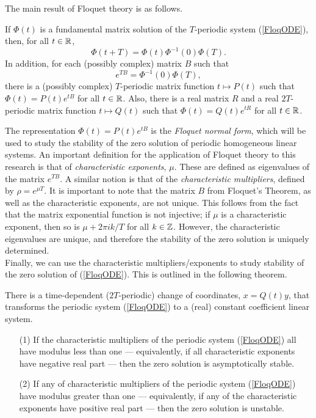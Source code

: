 \documentclass[12pt]{UOthesis}
\theoremstyle{remarkstyle}
\begin{document}
The main result of Floquet theory is as follows.

\begin{theo}
	If $\Phi(t)$ is a fundamental matrix solution of the $T$-periodic system (\ref{FloqODE}), then, for all $t\in \mathbb R$,
	$$\Phi(t+T)=\Phi(t)\Phi^{-1}(0)\Phi(T).$$
	In addition, for each (possibly complex) matrix $B$ such that
	$$e^{TB}=\Phi^{-1}(0)\Phi(T),$$
	there is a (possibly complex) $T$-periodic matrix function $t\mapsto P(t)$ such that $\Phi(t)=P(t)e^{tB}$ for all $t\in \mathbb R$. Also, there is a real matrix $R$ and a real $2T$-periodic matrix function $t\mapsto Q(t)$ such that $\Phi(t)=Q(t)e^{tR}$ for all $t\in \mathbb R$.
	\label{TheoFloquetsTheorem}
\end{theo}
	
The representation $\Phi(t)=P(t)e^{tB}$ is the \textit{Floquet normal form}, which will be used to study the stability of the zero solution of periodic homogeneous linear systems. An important definition for the application of Floquet theory to this research is that of \textit{characteristic exponents}, $\mu$. These are defined as eigenvalues of the matrix $e^{TB}$. A similar notion is that of the \textit{characteristic multipliers}, defined by $\rho=e^{\mu T}$. It is important to note that the matrix $B$ from Floquet's Theorem, as well as the characteristic exponents, are not unique. This follows from the fact that the matrix exponential function is not injective; if $\mu$ is a characteristic exponent, then so is $\mu+2\pi ik/T$ for all $k\in\mathbb Z$. However, the characteristic eigenvalues are unique, and therefore the stability of the zero solution is uniquely determined.\\

Finally, we can use the characteristic multipliers/exponents to study stability of the zero solution of (\ref{FloqODE}). This is outlined in the following theorem.

\begin{theo}
	There is a time-dependent ($2T$-periodic) change of coordinates, $x=Q(t)y$, that transforms the periodic system (\ref{FloqODE}) to a (real) constant coefficient linear system.
	\begin{itemize}
		\item[(1)] If the characteristic multipliers of the periodic system (\ref{FloqODE}) all have modulus less than one --- equivalently, if all characteristic exponents have negative real part --- then the zero solution is asymptotically stable.
		
		\item[(2)] If any of characteristic multipliers of the periodic system (\ref{FloqODE}) have modulus greater than one --- equivalently, if any of the characteristic exponents have positive real part --- then the zero solution is unstable.
	\end{itemize}
	\label{TheoFloquetStability}
\end{theo}
\end{document}
